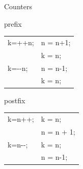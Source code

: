 \documentclass[xcolor={dvipsnames}]{beamer}
\begin{document}
\begin{frame}{Counters}
	\center
\begin{block}{prefix}
	\begin{tabularx}{\textwidth}{| X | X |}
		\hline
		k=++n; & n = n+1; \\
			   & k = n;\\
		\hline
		k=$\text{-}\text{-}$n; &  n = n-1;\\
			&  k = n;\\
		\hline
	\end{tabularx}	
\end{block}
\begin{block}{postfix}
	\begin{tabularx}{\textwidth}{| X | X |}
		\hline
		k=n++; & k = n; \\
			   & n = n + 1;\\
		\hline
		k=n$\text{-}\text{-}$; &  k = n;\\
					     &  n = n-1;\\
		\hline
	\end{tabularx}
\end{block}
\end{frame}
\end{document}
